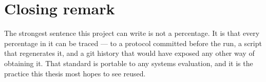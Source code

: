 \section{Closing remark}

The strongest sentence this project can write is not a percentage. It is
that every percentage in it can be traced --- to a protocol committed before
the run, a script that regenerates it, and a git history that would have
exposed any other way of obtaining it. That standard is portable to any
systems evaluation, and it is the practice this thesis most hopes to see
reused.
